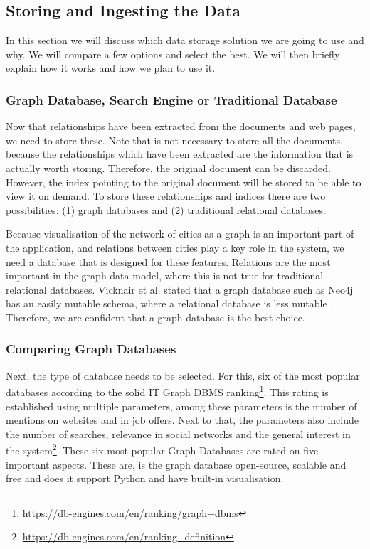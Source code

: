 \subsection{Storing and Ingesting the Data}
In this section we will discuss which data storage solution we are going to use and why. We will compare a few options and select the best. We will then briefly explain how it works and how we plan to use it.

\subsubsection{Graph Database, Search Engine or Traditional Database}
Now that relationships have been extracted from the documents and web pages, we need to store these. Note that is not necessary to store all the documents, because the relationships which have been extracted are the information that is actually worth storing. Therefore, the original document can be discarded. However, the index pointing to the original document will be stored to be able to view it on demand. To store these relationships and indices there are two possibilities: (1) graph databases and (2) traditional relational databases.

Because visualisation of the network of cities as a graph is an important part of the application, and relations between cities play a key role in the system, we need a database that is designed for these features. Relations are the most important in the graph data model, where this is not true for traditional relational databases. Vicknair et al. stated that a graph database such as Neo4j has an easily mutable schema, where a relational database is less mutable \cite{vicknair2010}.  Therefore, we are confident that a graph database is the best choice.

\subsubsection{Comparing Graph Databases}
Next, the type of database needs to be selected. For this, six of the most popular databases according to the solid IT Graph DBMS ranking\footnote{\url{https://db-engines.com/en/ranking/graph+dbms}\label{ranking}}.  This rating is established using multiple parameters, among these parameters is the number of mentions on websites and in job offers. Next to that, the parameters also include the number of searches, relevance in social networks and the general interest in the system\footnote{\url{https://db-engines.com/en/ranking_definition}}. These six most popular Graph Databases are rated on five important aspects. These are, is the graph database open-source, scalable and free and does it support Python and have built-in visualisation. \\


